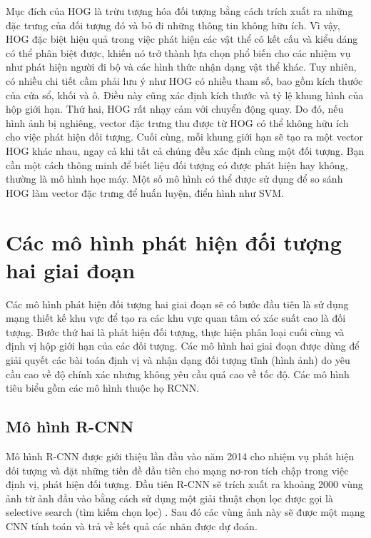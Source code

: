 \documentclass[../the.tex]{subfiles}
\begin{document}
\bigskip

{\fontsize{13}{12} \selectfont
	Mục đích của HOG là trừu tượng hóa đối tượng bằng cách trích xuất ra những đặc trưng của đối tượng đó và bỏ đi những thông tin không hữu ích.
	Vì vậy, HOG đặc biệt hiệu quả trong việc phát hiện các vật thể có kết cấu và kiểu dáng có thể phân biệt được, khiến nó trở thành lựa chọn phổ biến cho các nhiệm vụ như phát hiện người đi bộ và các hình thức nhận dạng vật thể khác.
	Tuy nhiên, có nhiều chi tiết cầm phải lưu ý như HOG có nhiều tham số, bao gồm kích thước của cửa sổ, khối và ô. Điều này cũng xác định kích thước và tỷ lệ khung hình của hộp giới hạn.
	Thứ hai, HOG rất nhạy cảm với chuyển động quay. Do đó, nếu hình ảnh bị nghiêng, vector đặc trưng thu được từ HOG có thể không hữu ích cho việc phát hiện đối tượng.
	Cuối cùng, mỗi khung giới hạn sẽ tạo ra một vector HOG khác nhau, ngay cả khi tất cả chúng đều xác định cùng một đối tượng. Bạn cần một cách thông minh để biết liệu đối tượng có được phát hiện hay không, thường là mô hình học máy.
	Một số mô hình có thể được sử dụng để so sánh HOG làm vector đặc trưng để huấn luyện, điển hình như SVM.
}

\section{Các mô hình phát hiện đối tượng hai giai đoạn }

 {\fontsize{13}{12} \selectfont
  Các mô hình phát hiện đối tượng hai giai đoạn sẽ có bước đầu tiên là sử dụng mạng thiết kế khu vực để tạo ra các khu vực quan tâm có xác suất cao là đối tượng.
  Bước thứ hai là phát hiện đối tượng, thực hiện phân loại cuối cùng và định vị hộp giới hạn của các đối tượng.
  Các mô hình hai giai đoạn được dùng để giải quyết các bài toán định vị và nhận dạng đối tượng tĩnh (hình ảnh) do yêu cầu cao về độ chính xác nhưng không yêu cầu quá cao về tốc độ.
  Các mô hình tiêu biểu gồm các mô hình thuộc họ RCNN.
 }

\subsection{Mô hình R-CNN}

{\fontsize{13}{12} \selectfont
	Mô hình R-CNN được giới thiệu lần đầu vào năm 2014 \cite{girshick2014rich} cho nhiệm vụ phát hiện đối tượng và đặt những tiền đề đầu tiên cho mạng nơ-ron tích chập
	trong việc định vị, phát hiện đối tượng. Đầu tiên R-CNN sẽ trích xuất ra khoảng 2000 vùng ảnh từ ảnh đầu vào bằng cách sử dụng một giải thuật chọn lọc được gọi là selective search (tìm kiếm chọn lọc) \cite{uijlings2013selective}.
	Sau đó các vùng ảnh này sẽ được một mạng CNN tính toán và trả về kết quả các nhãn được dự đoán.
}
\end{document}

